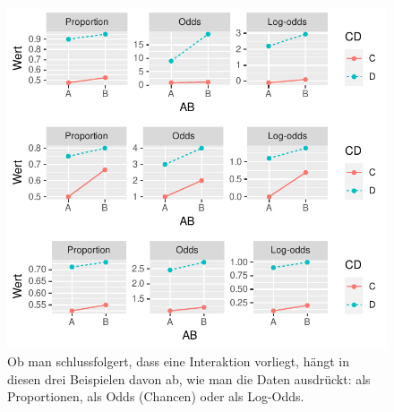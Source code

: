 \documentclass[oneside, 10pt]{book}\usepackage[]{graphicx}\usepackage[]{xcolor}
\newenvironment{knitrout}{}{} %
\begin{document}
\begin{knitrout}
\color{fgcolor}\begin{figure}[tp]

{\centering \includegraphics[width=.8\textwidth]{figs/unnamed-chunk-456-1} 

}

\caption{Ob man schlussfolgert, dass eine Interaktion vorliegt, hängt in diesen drei Beispielen davon ab, wie man die Daten ausdrückt: als Proportionen, als Odds (Chancen) oder als Log-Odds.\label{fig:interactionlogistic}}\label{fig:unnamed-chunk-456}
\end{figure}

\end{knitrout}

\medskip
\end{document}
